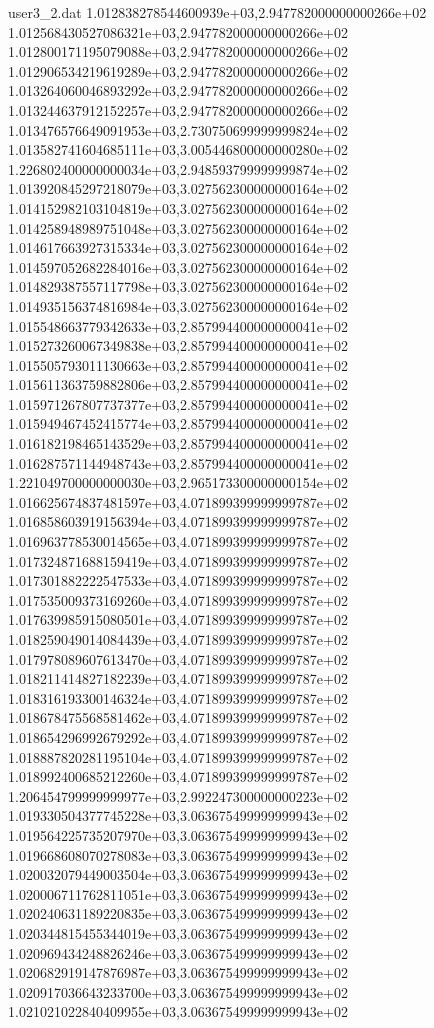 \begin{filecontents}{user3_2.dat}
1.012838278544600939e+03,2.947782000000000266e+02
1.012568430527086321e+03,2.947782000000000266e+02
1.012800171195079088e+03,2.947782000000000266e+02
1.012906534219619289e+03,2.947782000000000266e+02
1.013264060046893292e+03,2.947782000000000266e+02
1.013244637912152257e+03,2.947782000000000266e+02
1.013476576649091953e+03,2.730750699999999824e+02
1.013582741604685111e+03,3.005446800000000280e+02
1.226802400000000034e+03,2.948593799999999874e+02
1.013920845297218079e+03,3.027562300000000164e+02
1.014152982103104819e+03,3.027562300000000164e+02
1.014258948989751048e+03,3.027562300000000164e+02
1.014617663927315334e+03,3.027562300000000164e+02
1.014597052682284016e+03,3.027562300000000164e+02
1.014829387557117798e+03,3.027562300000000164e+02
1.014935156374816984e+03,3.027562300000000164e+02
1.015548663779342633e+03,2.857994400000000041e+02
1.015273260067349838e+03,2.857994400000000041e+02
1.015505793011130663e+03,2.857994400000000041e+02
1.015611363759882806e+03,2.857994400000000041e+02
1.015971267807737377e+03,2.857994400000000041e+02
1.015949467452415774e+03,2.857994400000000041e+02
1.016182198465143529e+03,2.857994400000000041e+02
1.016287571144948743e+03,2.857994400000000041e+02
1.221049700000000030e+03,2.965173300000000154e+02
1.016625674837481597e+03,4.071899399999999787e+02
1.016858603919156394e+03,4.071899399999999787e+02
1.016963778530014565e+03,4.071899399999999787e+02
1.017324871688159419e+03,4.071899399999999787e+02
1.017301882222547533e+03,4.071899399999999787e+02
1.017535009373169260e+03,4.071899399999999787e+02
1.017639985915080501e+03,4.071899399999999787e+02
1.018259049014084439e+03,4.071899399999999787e+02
1.017978089607613470e+03,4.071899399999999787e+02
1.018211414827182239e+03,4.071899399999999787e+02
1.018316193300146324e+03,4.071899399999999787e+02
1.018678475568581462e+03,4.071899399999999787e+02
1.018654296992679292e+03,4.071899399999999787e+02
1.018887820281195104e+03,4.071899399999999787e+02
1.018992400685212260e+03,4.071899399999999787e+02
1.206454799999999977e+03,2.992247300000000223e+02
1.019330504377745228e+03,3.063675499999999943e+02
1.019564225735207970e+03,3.063675499999999943e+02
1.019668608070278083e+03,3.063675499999999943e+02
1.020032079449003504e+03,3.063675499999999943e+02
1.020006711762811051e+03,3.063675499999999943e+02
1.020240631189220835e+03,3.063675499999999943e+02
1.020344815455344019e+03,3.063675499999999943e+02
1.020969434248826246e+03,3.063675499999999943e+02
1.020682919147876987e+03,3.063675499999999943e+02
1.020917036643233700e+03,3.063675499999999943e+02
1.021021022840409955e+03,3.063675499999999943e+02

\end{filecontents}
